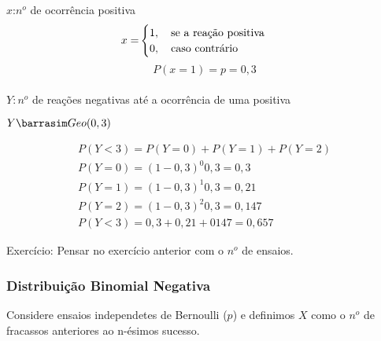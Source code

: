 \documentclass[11pt,a4paper]{book}
\begin{document}
\begin{enumerate}[label=(\alph*)]
\begin{enumerate}
$x$:$n^o$ de ocorrência positiva 
\begin{align*}
  x=&\begin{cases}
    1, \text{\quad se a reação positiva}\\
    0, \text{\quad caso contrário}
  \end{cases}
\end{align*}
$$P(x=1)=p=0,3$$\\
$Y: n^o$ de reações negativas até a ocorrência de uma positiva\\
\begin{center}$Y \barrasim Geo(0,3)$\end{center}
\begin{align*}
  P(Y<3)=P(Y=0)+P(Y=1)+P(Y=2)\\
  P(Y=0)=(1-0,3)^0 0,3 = 0,3\\
  P(Y=1)=(1-0,3)^1 0,3 = 0,21\\
  P(Y=2)=(1-0,3)^2 0,3 = 0,147\\
  P(Y<3)=0,3+0,21+0147=0,657
\end{align*}

Exercício: Pensar no exercício anterior com o $n^o$ de ensaios.

\subsubsection{Distribuição Binomial Negativa}
Considere ensaios independetes de Bernoulli ($p$) e definimos $X$ como o $n^o$ 
de fracassos anteriores ao n-ésimos sucesso.


\end{enumerate}
\end{enumerate}
\end{document}
